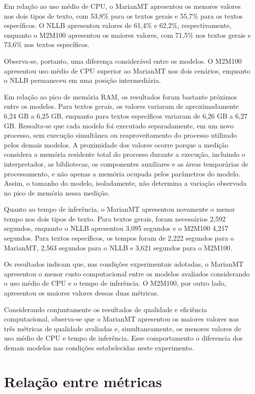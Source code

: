 Em relação ao uso médio de CPU, o MarianMT apresentou os menores valores nos dois tipos de texto, com 53,8\% para os textos gerais e 55,7\% para os textos específicos. O NLLB apresentou valores de 61,4\% e 62,2\%, respectivamente, enquanto o M2M100 apresentou os maiores valores, com 71,5\% nos textos gerais e 73,6\% nos textos específicos.

Observa-se, portanto, uma diferença considerável entre os modelos. O M2M100 apresentou uso médio de CPU superior ao MarianMT nos dois cenários, enquanto o NLLB permaneceu em uma posição intermediária.

Em relação ao pico de memória RAM, os resultados foram bastante próximos entre os modelos. Para textos gerais, os valores variaram de aproximadamente 6,24 GB a 6,25 GB, enquanto para textos específicos variaram de 6,26 GB a 6,27 GB. Ressalta-se que cada modelo foi executado separadamente, em um novo processo, sem execução simultânea ou reaproveitamento do processo utilizado pelos demais modelos. A proximidade dos valores ocorre porque a medição considera a memória residente total do processo durante a execução, incluindo o interpretador, as bibliotecas, os componentes auxiliares e as áreas temporárias de processamento, e não apenas a memória ocupada pelos parâmetros do modelo. Assim, o tamanho do modelo, isoladamente, não determina a variação observada no pico de memória nessa medição.

Quanto ao tempo de inferência, o MarianMT apresentou novamente o menor tempo nos dois tipos de texto. Para textos gerais, foram necessários 2,592 segundos, enquanto o NLLB apresentou 3,095 segundos e o M2M100 4,217 segundos. Para textos específicos, os tempos foram de 2,222 segundos para o MarianMT, 2,563 segundos para o NLLB e 3,621 segundos para o M2M100.

Os resultados indicam que, nas condições experimentais adotadas, o MarianMT apresentou o menor custo computacional entre os modelos avaliados considerando o uso médio de CPU e o tempo de inferência. O M2M100, por outro lado, apresentou os maiores valores dessas duas métricas.

Considerando conjuntamente os resultados de qualidade e eficiência computacional, observa-se que o MarianMT apresentou os maiores valores nas três métricas de qualidade avaliadas e, simultaneamente, os menores valores de uso médio de CPU e tempo de inferência. Esse comportamento o diferencia dos demais modelos nas condições estabelecidas neste experimento.

\section{Relação entre métricas}

